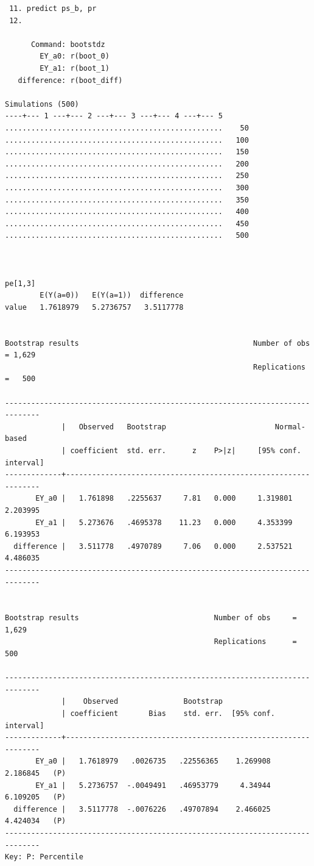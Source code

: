 \documentclass[
  10pt,
  a4paper,
]{book}
\begin{document}
\begin{verbatim}
 11. predict ps_b, pr
 12. 

      Command: bootstdz
        EY_a0: r(boot_0)
        EY_a1: r(boot_1)
   difference: r(boot_diff)

Simulations (500)
----+--- 1 ---+--- 2 ---+--- 3 ---+--- 4 ---+--- 5 
..................................................    50
..................................................   100
..................................................   150
..................................................   200
..................................................   250
..................................................   300
..................................................   350
..................................................   400
..................................................   450
..................................................   500



pe[1,3]
        E(Y(a=0))   E(Y(a=1))  difference
value   1.7618979   5.2736757   3.5117778


Bootstrap results                                        Number of obs = 1,629
                                                         Replications  =   500

------------------------------------------------------------------------------
             |   Observed   Bootstrap                         Normal-based
             | coefficient  std. err.      z    P>|z|     [95% conf. interval]
-------------+----------------------------------------------------------------
       EY_a0 |   1.761898   .2255637     7.81   0.000     1.319801    2.203995
       EY_a1 |   5.273676   .4695378    11.23   0.000     4.353399    6.193953
  difference |   3.511778   .4970789     7.06   0.000     2.537521    4.486035
------------------------------------------------------------------------------


Bootstrap results                               Number of obs     =      1,629
                                                Replications      =        500

------------------------------------------------------------------------------
             |    Observed               Bootstrap
             | coefficient       Bias    std. err.  [95% conf. interval]
-------------+----------------------------------------------------------------
       EY_a0 |   1.7618979   .0026735   .22556365    1.269908   2.186845   (P)
       EY_a1 |   5.2736757  -.0049491   .46953779     4.34944   6.109205   (P)
  difference |   3.5117778  -.0076226   .49707894    2.466025   4.424034   (P)
------------------------------------------------------------------------------
Key: P: Percentile
\end{verbatim}
\end{document}
